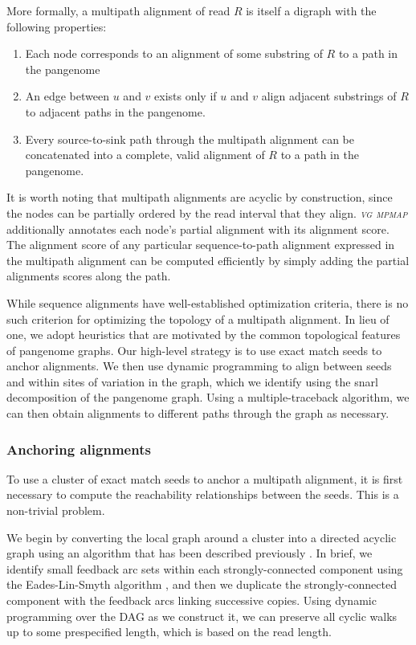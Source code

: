 \documentclass[11pt]{ucthesis}
\newcommand{\tool}[1]{\emph{\textsc{#1}}}
\begin{document}
More formally, a multipath alignment of read $R$ is itself a digraph with the following properties:

\begin{enumerate}
    \item Each node corresponds to an alignment of some substring of $R$ to a path in the pangenome
    \item An edge between $u$ and $v$ exists only if $u$ and $v$ align adjacent substrings of $R$ to adjacent paths in the pangenome.
    \item Every source-to-sink path through the multipath alignment can be concatenated into a complete, valid alignment of $R$ to a path in the pangenome.
\end{enumerate}

It is worth noting that multipath alignments are acyclic by construction, since the nodes can be partially ordered by the read interval that they align. \tool{vg mpmap} additionally annotates each node's partial alignment with its alignment score. The alignment score of any particular sequence-to-path alignment expressed in the multipath alignment can be computed efficiently by simply adding the partial alignments scores along the path.

While sequence alignments have well-established optimization criteria, there is no such criterion for optimizing the topology of a multipath alignment. In lieu of one, we adopt heuristics that are motivated by the common topological features of pangenome graphs. Our high-level strategy is to use exact match seeds to anchor alignments. We then use dynamic programming to align between seeds and within sites of variation in the graph, which we identify using the snarl decomposition of the pangenome graph. Using a multiple-traceback algorithm, we can then obtain alignments to different paths through the graph as necessary.

\subsubsection{Anchoring alignments}

To use a cluster of exact match seeds to anchor a multipath alignment, it is first necessary to compute the reachability relationships between the seeds. This is a non-trivial problem. 

We begin by converting the local graph around a cluster into a directed acyclic graph using an algorithm that has been described previously \cite{garrison2018variation}. In brief, we identify small feedback arc sets within each strongly-connected component using the Eades-Lin-Smyth algorithm \cite{eades1993fast}, and then we duplicate the strongly-connected component with the feedback arcs linking successive copies. Using dynamic programming over the DAG as we construct it, we can preserve all cyclic walks up to some prespecified length, which is based on the read length.
	
\end{document}
